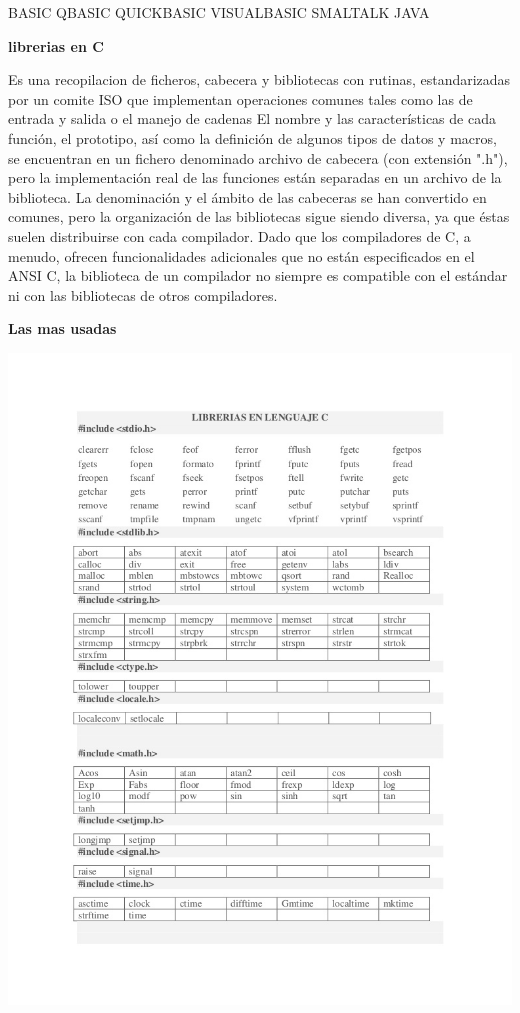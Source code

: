 \documentclass[11pt,a4paper]{article}
\begin{document}
\begin{multicols}{2}
BASIC QBASIC QUICKBASIC VISUALBASIC SMALTALK JAVA




\begin{center}
\textbf{librerias en C}
\end{center}
Es una recopilacion de ficheros, cabecera y bibliotecas con rutinas, estandarizadas por un comite ISO que implementan operaciones comunes tales como las de entrada y salida o el manejo de cadenas El nombre y las características de cada función, el prototipo, así como la definición de algunos tipos de datos y macros, se encuentran en un fichero denominado archivo de cabecera (con extensión ".h"), pero la implementación real de las funciones están separadas en un archivo de la biblioteca. La denominación y el ámbito de las cabeceras se han convertido en comunes, pero la organización de las bibliotecas sigue siendo diversa, ya que éstas suelen distribuirse con cada compilador. Dado que los compiladores de C, a menudo, ofrecen funcionalidades adicionales que no están especificados en el ANSI C, la biblioteca de un compilador no siempre es compatible con el estándar ni con las bibliotecas de otros compiladores.
\begin{center}
\textbf{Las mas usadas}
\end{center}

\includegraphics[scale=.40]{libreriac.jpg} 


\end{multicols}
\end{document}
